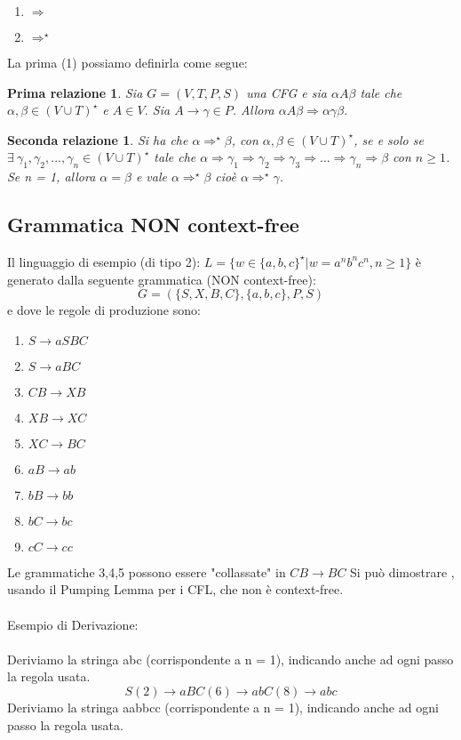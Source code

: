 \documentclass[11pt]{article}
\newtheorem*{relazioneNorm}{Prima relazione}
\newtheorem*{relazioneStar}{Seconda relazione}
\begin{document}
\begin{enumerate}
\item $\Rightarrow$
\item $\Rightarrow^{\star}$
\end{enumerate}
La prima (1) possiamo definirla come segue:
\begin{relazioneNorm}
Sia $G=(V, T,P,S)$ una CFG e sia $\alpha A \beta$ tale che $\alpha,\beta \in (V\cup T)^{\star}$ e $A \in V$. Sia $A \rightarrow \gamma \in P$. Allora $\alpha A\beta \Rightarrow \alpha \gamma \beta$.
\end{relazioneNorm}
\begin{relazioneStar}
Si ha che $\alpha \Rightarrow^{\star} \beta$, con $\alpha, \beta \in (V \cup T)^{\star}$, se e solo se $\exists \medspace \gamma_{1}, \gamma_{2}, ... ,\gamma_{n} \in (V\cup T)^{\star}$ tale che $\alpha \Rightarrow \gamma_{1} \Rightarrow \gamma_{2} \Rightarrow \gamma_{3} \Rightarrow ... \Rightarrow \gamma_{n} \Rightarrow \beta$ con $n \geq 1$.
Se n = 1, allora $\alpha = \beta$ e vale $\alpha \Rightarrow^{\star} \beta$ cioè $\alpha \Rightarrow^{\star} \gamma$.
\end{relazioneStar}
\subsection{Grammatica NON context-free}
Il linguaggio di esempio (di tipo 2): $L = \{w \in \{a,b,c\}^{\star} | w = a^nb^nc^n, n\geq 1\}$
è generato dalla seguente grammatica (NON context-free): $$ G=(\{S,X,B,C\}, \{a,b,c\}, P, S)$$
e dove le regole di produzione sono:
\begin{enumerate}
	\item $S \rightarrow aSBC$
	\item $S \rightarrow aBC$
	\item $CB \rightarrow XB$
	\item $XB \rightarrow XC$
	\item $XC \rightarrow BC$
	\item $aB \rightarrow ab$
	\item $bB \rightarrow bb$
	\item $bC \rightarrow bc$
	\item $cC \rightarrow cc$
\end{enumerate}
Le grammatiche 3,4,5 possono essere "collassate" in $CB \rightarrow BC$
Si può dimostrare , usando il Pumping Lemma per i CFL, che non è context-free.
\\ \\
Esempio di Derivazione:
\\ \\
Deriviamo la stringa abc (corrispondente a n = 1), indicando anche ad ogni passo la regola usata.
$$ S (2)\rightarrow aBC (6)\rightarrow abC (8)\rightarrow abc$$
Deriviamo la stringa aabbcc (corrispondente a n = 1), indicando anche ad ogni passo la regola usata.
\end{document}
